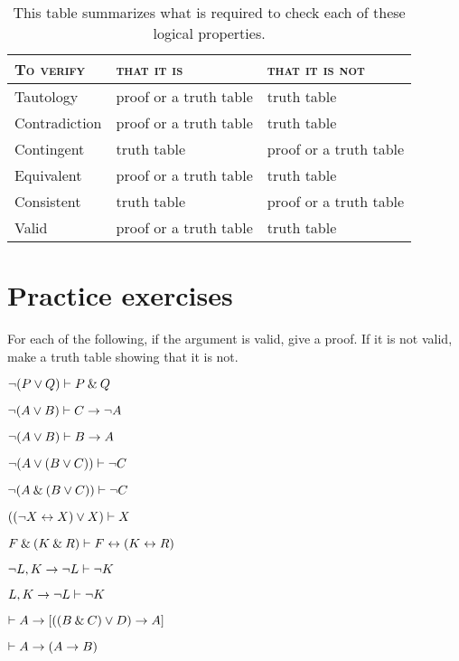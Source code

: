 \begin{table*}\centering\sffamily\footnotesize
{}
\begin{tabular}{@{}l l l@{}}\toprule
\textsc{To verify}			&	\textsc{that it is} &	\textsc{that it is not} \\\midrule
Tautology 		& proof or a truth table 							& truth table \\
Contradiction 	&  proof or a truth table  		 				& truth table\\ 
Contingent		& truth table 										& proof or a truth table\\
Equivalent 		& proof or a truth table 		 					& truth table\\
Consistent 		& truth table 										& proof or a truth table\\
Valid 				& proof or a truth table 							& truth table \\ 
\bottomrule
\end{tabular}
\caption{This table summarizes what is required to check each of these logical properties.}\label{table.proof-or-model}
\end{table*}



\section{Practice exercises}
\setcounter{ProbPart}{0}

\problempart  For each of the following, if the argument is valid, give a proof. If it is not valid, make a truth table showing that it is not. 
\begin{earg}
\item ${\neg} (P \vee Q) \vdash P \mathbin{\&} Q$

\item ${\neg}(A \vee B) \vdash C \rightarrow {\neg} A$

\item ${\neg}(A \vee B) \vdash B \rightarrow A$

\item ${\neg}(A \vee (B \vee C)) \vdash {\neg}{C}$
\item ${\neg}(A \mathbin{\&} (B \vee C)) \vdash {\neg}{C}$ 

\item $(({\neg} X \leftrightarrow X) \vee X) \vdash X$
\item $F \mathbin{\&} (K \mathbin{\&} R) \vdash F \leftrightarrow (K \leftrightarrow R)$

\item ${\neg} L,  K \rightarrow {\neg} L \vdash {\neg} K$
\item $L, K \rightarrow {\neg} L \vdash {\neg} K$ 

\item $\vdash A \rightarrow [((B \mathbin{\&} C) \vee D) \rightarrow A]$
\item $\vdash A \rightarrow (A \rightarrow B)$
\end{earg}



